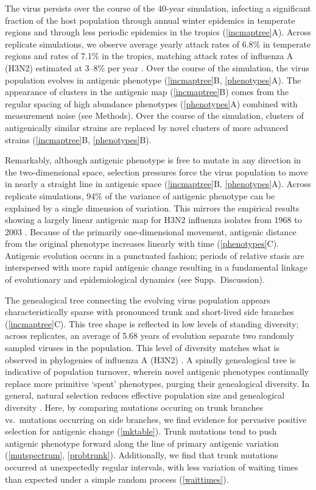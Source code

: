 The virus persists over the course of the 40-year simulation, infecting a significant fraction of the host population through annual winter epidemics in temperate regions and through less periodic epidemics in the tropics (\ref{incmaptree}A).  Across replicate simulations, we observe average yearly attack rates of 6.8\% in temperate regions and rates of 7.1\% in the tropics, matching attack rates of influenza A (H3N2) estimated at 3--8\% per year \cite{Monto93,Koelle09}.  Over the course of the simulation, the virus population evolves in antigenic phenotype (\ref{incmaptree}B, \ref{phenotypes}A).  The appearance of clusters in the antigenic map (\ref{incmaptree}B) comes from the regular spacing of high abundance phenotypes (\ref{phenotypes}A) combined with measurement noise (see Methods).  Over the course of the simulation, clusters of antigenically similar strains are replaced by novel clusters of more advanced strains (\ref{incmaptree}B, \ref{phenotypes}B).  

Remarkably, although antigenic phenotype is free to mutate in any direction in the two-dimensional space, selection pressures force the virus population to move in nearly a straight line in antigenic space (\ref{incmaptree}B, \ref{phenotypes}A).  Across replicate simulations, 94\% of the variance of antigenic phenotype can be explained by a single dimension of variation.  This mirrors the empirical results showing a largely linear antigenic map for H3N2 influenza isolates from 1968 to 2003 \cite{Smith04}.  Because of the primarily one-dimensional movement, antigenic distance from the original phenotype increases linearly with time (\ref{phenotypes}C).  Antigenic evolution occurs in a punctuated fashion; periods of relative stasis are interspersed with more rapid antigenic change resulting in a fundamental linkage of evolutionary and epidemiological dynamics (see Supp.~Discussion).

The genealogical tree connecting the evolving virus population appears characteristically sparse with pronounced trunk and short-lived side branches  (\ref{incmaptree}C).  This tree shape is reflected in low levels of standing diversity; across replicates, an average of 5.68 years of evolution separate two randomly sampled viruses in the population.  This level of diversity matches what is observed in phylogenies of influenza A (H3N2) \cite{Rambaut08}.  A spindly genealogical tree is indicative of population turnover, wherein novel antigenic phenotypes continually replace more primitive `spent' phenotypes, purging their genealogical diversity.  In general, natural selection reduces effective population size and genealogical diversity \cite{BedfordBMC11}.  Here, by comparing mutations occuring on trunk branches vs.\ mutations occurring on side branches, we find evidence for pervasive positive selection for antigenic change (\ref{mktable}).  Trunk mutations tend to push antigenic phenotype forward along the line of primary antigenic variation (\ref{mutspectrum}, \ref{probtrunk}).  Additionally, we find that trunk mutations occurred at unexpectedly regular intervals, with less variation of waiting times than expected under a simple random process (\ref{waittimes}).

